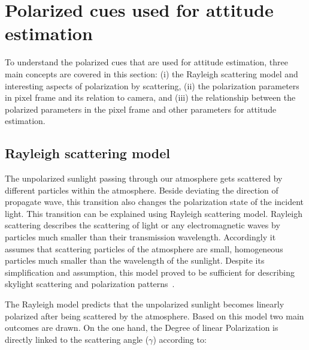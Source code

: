 \graphicspath{{./content/intro/figures/}}

\section{Polarized cues used for attitude estimation}
\label{sec:pcues}
To understand the polarized cues that are used for attitude estimation, three
main concepts are covered in this section: (i) the Rayleigh scattering model and
interesting aspects of polarization by scattering, (ii) the polarization
parameters in pixel frame and its relation to camera, and (iii) the
relationship between the polarized parameters in the pixel frame and other
parameters for attitude estimation.

\subsection{Rayleigh scattering model}
\label{subsec:rayleigh}
The unpolarized sunlight passing through our atmosphere gets scattered by
different particles within the atmosphere.  Beside deviating the direction of
propagate wave, this transition also changes the polarization state of the
incident light. This transition can be explained using Rayleigh scattering
model.  Rayleigh scattering describes the scattering of light or any
electromagnetic waves by particles much smaller than their transmission
wavelength. Accordingly it assumes that scattering particles of the atmosphere
are small, homogeneous particles much smaller than the wavelength of the
sunlight.  Despite its simplification and assumption, this model proved to be
sufficient for describing skylight scattering and polarization
patterns~\cite{pomozi2001clearsky, horvath2002ground}.

The Rayleigh model predicts that the unpolarized sunlight becomes linearly
polarized after being scattered by the atmosphere. Based on this model two
main outcomes are drawn. On the one hand, the Degree of linear Polarization is
directly linked to the scattering angle ($\gamma$) according to:

